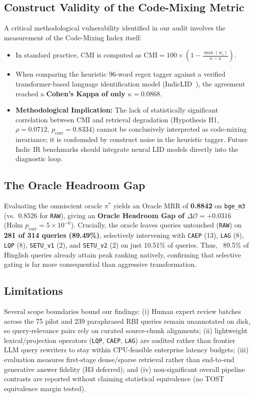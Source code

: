 \documentclass[conference]{IEEEtran}
\begin{document}
\subsection{Construct Validity of the Code-Mixing Metric}
A critical methodological vulnerability identified in our audit involves the measurement of the Code-Mixing Index itself:
\begin{itemize}
    \item In standard practice, CMI is computed as $\text{CMI} = 100 \times (1 - \frac{\max(w_i)}{n - u})$.
    \item When comparing the heuristic 96-word regex tagger against a verified transformer-based language identification model (IndicLID~\cite{madhani2023indiclid}), the agreement reached a \textbf{Cohen's Kappa of only $\kappa = 0.0868$}.
    \item \textbf{Methodological Implication:} The lack of statistically significant correlation between CMI and retrieval degradation (Hypothesis H1, $\rho = 0.0712$, $p_{\text{corr}} = 0.8334$) cannot be conclusively interpreted as code-mixing invariance; it is confounded by construct noise in the heuristic tagger. Future Indic IR benchmarks should integrate neural LID models directly into the diagnostic loop.
\end{itemize}

\subsection{The Oracle Headroom Gap}
Evaluating the omniscient oracle $\pi^*$ yields an Oracle MRR of \textbf{0.8842} on \texttt{bge\_m3} (vs.\ 0.8526 for \texttt{RAW}), giving an \textbf{Oracle Headroom Gap of $\Delta\mathcal{O} = +0.0316$} (Holm $p_{\text{corr}} = 5 \times 10^{-6}$). Crucially, the oracle leaves queries untouched (\texttt{RAW}) on \textbf{281 of 314 queries (89.49\%)}, selectively intervening with \texttt{CAEP} (13), \texttt{LAG} (8), \texttt{LQP} (8), \texttt{SETU\_v1} (2), and \texttt{SETU\_v2} (2) on just 10.51\% of queries. Thus, ~89.5\% of Hinglish queries already attain peak ranking natively, confirming that selective gating is far more consequential than aggressive transformation.

\subsection{Limitations}
Several scope boundaries bound our findings: (i) Human expert review batches across the 75 pilot and 239 paraphrased RBI queries remain unannotated on disk, so query-relevance pairs rely on curated source-chunk alignments; (ii) lightweight lexical/projection operators (\texttt{LQP}, \texttt{CAEP}, \texttt{LAG}) are audited rather than frontier LLM query rewriters to stay within CPU-feasible enterprise latency budgets; (iii) evaluation measures first-stage dense/sparse retrieval rather than end-to-end generative answer fidelity (H3 deferred); and (iv) non-significant overall pipeline contrasts are reported without claiming statistical equivalence (no TOST equivalence margin tested).
\end{document}
